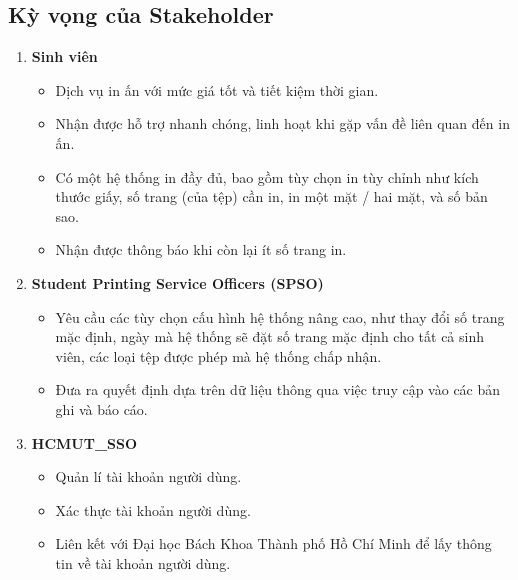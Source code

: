 \documentclass[a4paper]{article}
\begin{document}
    \subsection{Kỳ vọng của Stakeholder}
        \begin{enumerate}
        \item {\textbf{Sinh viên}}
            \begin{itemize}
                \item Dịch vụ in ấn với mức giá tốt và tiết kiệm thời gian.
                \item Nhận được hỗ trợ nhanh chóng, linh hoạt khi gặp vấn đề liên quan đến in ấn.
                \item Có một hệ thống in đầy đủ, bao gồm tùy chọn in tùy chỉnh như kích thước giấy, số trang (của tệp) cần in, in một mặt / hai mặt, và số bản sao.
                \item Nhận được thông báo khi còn lại ít số trang in.
            \end{itemize}
        \item {\textbf{Student Printing Service Officers (SPSO)}}
            \begin{itemize}
                \item Yêu cầu các tùy chọn cấu hình hệ thống nâng cao, như thay đổi số trang mặc định, ngày mà hệ thống sẽ đặt số trang mặc định cho tất cả sinh viên, các loại tệp được phép mà hệ thống chấp nhận.
                \item Đưa ra quyết định dựa trên dữ liệu thông qua việc truy cập vào các bản ghi và báo cáo.
            \end{itemize}
            \item {\textbf{HCMUT\_SSO }}
            \begin{itemize}
                \item Quản lí tài khoản người dùng.
                \item Xác thực tài khoản người dùng.
                \item Liên kết với Đại học Bách Khoa Thành phố Hồ Chí Minh để lấy thông tin về tài khoản người dùng.

\end{itemize}
\end{enumerate}
\end{document}
